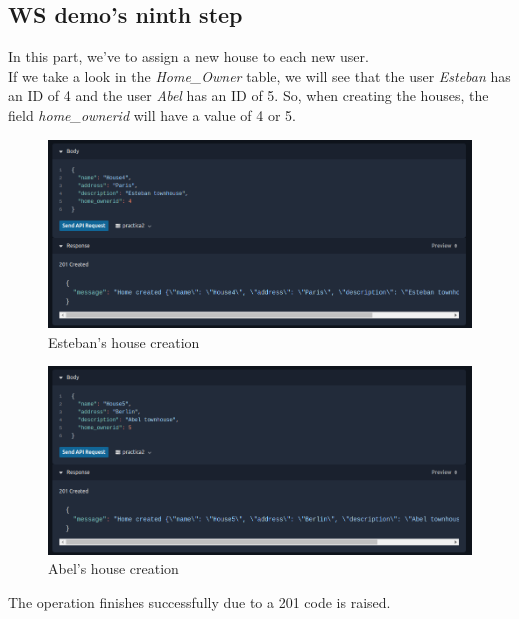 \documentclass[a4paper,12pt]{article}
\begin{document}
\subsection*{WS demo's ninth step}
In this part, we've to assign a new house to each new user.\\
If we take a look in the \textit{Home\_Owner} table, we will see that the user \textit{Esteban} has an ID of 4 and the user \textit{Abel} has an ID of 5. So, when creating the houses, the field \textit{home\_ownerid} will have a value of 4 or 5.
\begin{figure}[H]
    \centering
    \includegraphics[scale = 0.5]{images/Esteban house.png}
    \caption{Esteban's house creation}
    \label{fig:esteban}
\end{figure}
\begin{figure}[H]
    \centering
    \includegraphics[scale = 0.5]{images/Abel house.png}
    \caption{Abel's house creation}
    \label{fig:abel}
\end{figure}
The operation finishes successfully due to a 201 code is raised.
\end{document}
